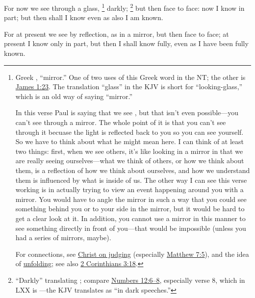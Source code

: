 			For now we see through a glass,%
				\footnote{%
					\label{1CORINTHIANS-13-12-NOTE-glass}%
					Greek , ``mirror.'' One of two uses of this Greek word in the NT; the other is \hyperref[JAMES-1-23]{James 1:23}. The translation ``glass'' in the KJV is short for ``looking-glass,'' which is an old way of saying ``mirror.'' 
					
					In this verse Paul is saying that we see , but that isn't even possible---you can't see through a mirror. The whole point of it is that you can't see through it becuase the light is reflected back to you so you can see yourself. So we have to think about what he might mean here. I can think of at least two things: first, when we see others, it's like looking in a mirror in that we are really seeing ourselves---what we think of others, or how we think about them, is a reflection of how we think about ourselves, and how we understand them is influenced by what is inside of us. The other way I can see this verse working is in actually trying to view an event happening around you with a mirror. You would have to angle the mirror in such a way that you could see something behind you or to your side in the mirror, but it would be hard to get a clear look at it. In addition, you cannot use a mirror in this manner to see something directly in front of you---that would be impossible (unless you had a series of mirrors, maybe). 
					
					For connections, see \hyperref[LCHRIST-055]{Christ on judging} (especially \hyperref[LCHRIST-055-MT]{Matthew 7:5}), and the idea of \hyperref[UNFOLD]{unfolding}; see also \hyperref[2CORINTHIANS-3-18]{2 Corinthians 3:18}.
					}
			darkly;%
				\footnote{%
					``Darkly'' translating ; compare \hyperref[NUMBERS-12-6]{Numbers 12:6--8}, especially verse 8, which in LXX is ---the KJV translates  as ``in dark speeches.'' 
					}
			but then face to face: now I know in part; but then shall I know even as also I am known.
			
			\begin{framed}
			\scriptsize
				\begin{compactdesc}
					\item[SBLG] 
					\item[AB 487] For at present we see by reflection, as in a mirror, but then face to face; at present I know only in part, but then I shall know fully, even as I have been fully known. 
				\end{compactdesc} 
			\end{framed}

